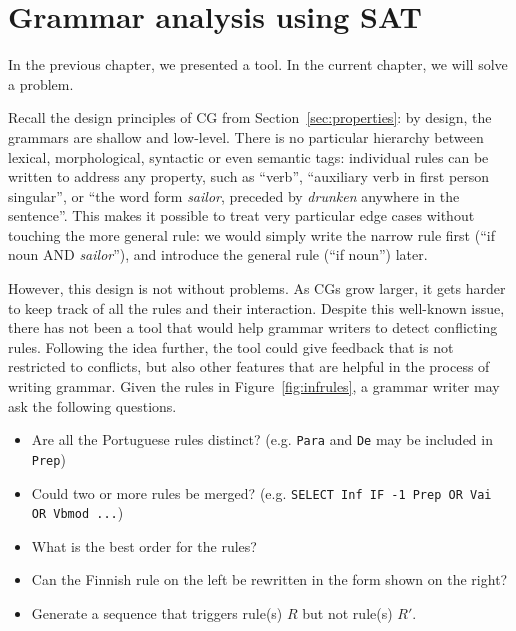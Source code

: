 \def\newcite#1{\cite{#1}}

\chapter{Grammar analysis using SAT}
\label{chapterCGana}


In the previous chapter, we presented a tool.
In the current chapter, we will solve a problem.




Recall the design principles of CG from Section~\ref{sec:properties}: 
by design, the grammars are shallow and low-level.
There is no particular hierarchy between lexical, morphological,
syntactic or even semantic tags: individual rules can be written to address any
property, such as ``verb'', ``auxiliary verb in first person singular'',
or ``the word form \emph{sailor}, preceded by \emph{drunken} anywhere in the
sentence''. This makes it possible to treat very particular edge
cases without touching the more general rule: we would simply write
the narrow rule first (``if noun AND \emph{sailor}''), and introduce
the general rule (``if noun'') later.


However, this design is not without problems. As CGs grow larger, it
gets harder to keep track of all the rules and their interaction.
Despite this well-known issue, there has not been a tool that would help 
grammar writers to detect conflicting rules.
Following the idea further, the tool could give feedback that is not 
restricted to conflicts, but also other features that are helpful 
in the process of writing grammar.
Given the rules in Figure~\ref{fig:infrules}, a grammar writer may 
ask the following questions.



\begin{itemize}
\item Are all the Portuguese rules distinct? (e.g. \texttt{Para} and \texttt{De} may be included in \texttt{Prep})
\item Could two or more rules be merged? (e.g. \texttt{SELECT Inf IF -1 Prep OR Vai OR Vbmod ...})
\item What is the best order for the rules?
\item Can the Finnish rule on the left be rewritten in the form shown on the right?
\item Generate a sequence that triggers rule(s) $R$ but not rule(s) $R'$. 
\end{itemize}



